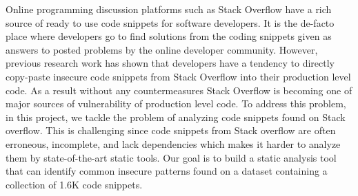 Online programming discussion platforms such as Stack Overflow have a rich source of ready to use code snippets for software developers. It is the de-facto place where developers go to find solutions from the coding snippets given as answers to posted problems by the online developer community. However, previous research work has shown that developers have a tendency to directly copy-paste insecure code snippets from Stack Overflow into their production level code. 
As a result without any countermeasures Stack Overflow is becoming one of major sources of vulnerability of production level code. To address this problem, in this project, we tackle the problem of analyzing code snippets found on Stack overflow. This is challenging since code snippets from Stack overflow are often erroneous, incomplete, and lack dependencies which makes it harder to analyze them by state-of-the-art static tools. Our goal is to build a static analysis tool that can identify common insecure patterns found on a dataset containing a collection of 1.6K code snippets. 
